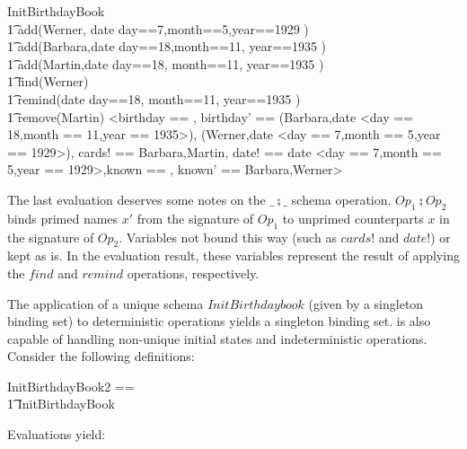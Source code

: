 \documentclass{article}
\begin{document}
\begin{zexecexpr}
 InitBirthdayBook   \\\t1
 \semi add(Werner, date \lbind day==7,month==5,year==1929 \rbind) \\\t1
 \semi add(Barbara,date \lbind day==18,month==11, year==1935 \rbind)\\\t1
 \semi add(Martin,date \lbind day==18, month==11, year==1935 \rbind)\\\t1
 \semi find(Werner)\\\t1
 \semi remind(date \lbind day==18, month==11, year==1935 \rbind)\\\t1
 \semi remove(Martin)
\yields
{<birthday == {},
  birthday' ==
   {(Barbara,date <day == 18,month == 11,year == 1935>),
    (Werner,date <day == 7,month == 5,year == 1929>)},
  cards! == {Barbara,Martin},
  date! == date <day == 7,month == 5,year == 1929>,known == {},
  known' == {Barbara,Werner}>}
\end{zexecexpr}

The last evaluation deserves some notes on the $\_ \semi \_$ schema
operation. $Op_1 \semi Op_2$ binds primed names $x'$ from the
signature of $Op_1$ to unprimed counterparts $x$ in the signature of
$Op_2$. Variables not bound this way (such as $cards!$ and $date!$) 
or kept as is. In the evaluation result, these variables represent the
result of applying the $find$ and $remind$ operations, respectively.

The application of a unique schema $InitBirthdaybook$ (given by a
singleton binding set) to deterministic operations yields a singleton
binding set. \ZAP{} is also capable of handling non-unique initial states
and indeterministic operations. Consider the following definitions:

\begin{zed}
  InitBirthdayBook2 == \\\t1
    \< InitBirthdayBook \lor \\
       [ BirthdayBook | \\\t1
           birthday = \{Werner \mapsto 
                         date \lbind day==7,month==5,year==1929 \rbind\} ] \>
\end{zed}

Evaluations yield:
\end{document}
